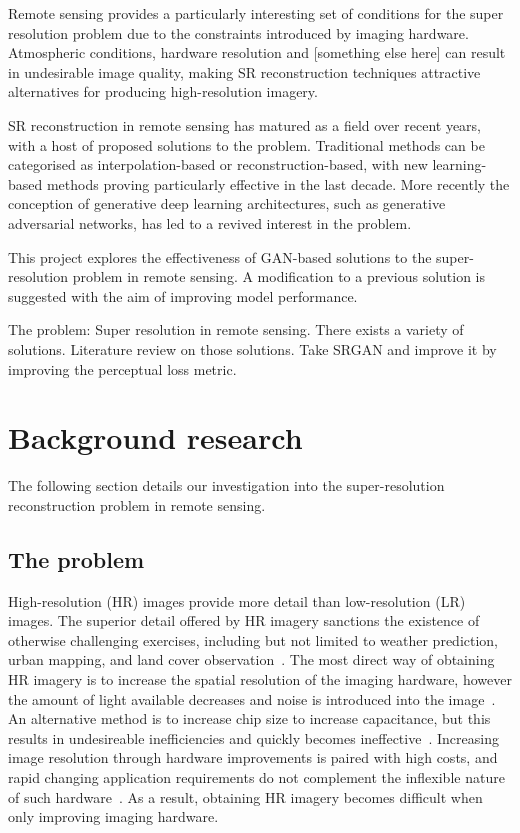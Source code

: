 Remote sensing provides a particularly interesting set of conditions for the super resolution problem due to the constraints introduced by imaging hardware. Atmospheric conditions, hardware resolution and [something else here] can result in undesirable image quality, making SR reconstruction techniques attractive alternatives for producing high-resolution imagery.

SR reconstruction in remote sensing has matured as a field over recent years, with a host of proposed solutions to the problem. Traditional methods can be categorised as interpolation-based or reconstruction-based, with new learning-based methods proving particularly effective in the last decade. More recently the conception of generative deep learning architectures, such as generative adversarial networks, has led to a revived interest in the problem.

This project explores the effectiveness of GAN-based solutions to the super-resolution problem in remote sensing. A modification to a previous solution is suggested with the aim of improving model performance.

The problem: Super resolution in remote sensing. There exists a variety of solutions. Literature review on those solutions. Take SRGAN and improve it by improving the perceptual loss metric.

\clearpage
\section{Background research}\label{sec:background_research}
The following section details our investigation into the super-resolution reconstruction problem in remote sensing.

\subsection{The problem}\label{subsec:the_problem}
High-resolution (HR) images provide more detail than low-resolution (LR) images. The superior detail offered by HR imagery sanctions the existence of otherwise challenging exercises, including but not limited to weather prediction, urban mapping, and land cover observation~\cite{urbanMapping, mapping, cloudCover, vegetationMapping}. The most direct way of obtaining HR imagery is to increase the spatial resolution of the imaging hardware, however the amount of light available decreases and noise is introduced into the image~\cite{superResOverview}. An alternative method is to increase chip size to increase capacitance, but this results in undesireable inefficiencies and quickly becomes ineffective~\cite{superResOverview}. Increasing image resolution through hardware improvements is paired with high costs, and rapid changing application requirements do not complement the inflexible nature of such hardware~\cite{ref}. As a result, obtaining HR imagery becomes difficult when only improving imaging hardware.

